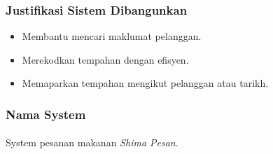 \documentclass[main.tex]{subfiles}
\begin{document}
\subsubsection*{Justifikasi Sistem Dibangunkan}

\begin{itemize}
    \item Membantu mencari maklumat pelanggan.
    \item Merekodkan tempahan dengan efisyen.
    \item Memaparkan tempahan mengikut pelanggan atau tarikh.
\end{itemize}

\subsubsection*{Nama System}

\paragraph{} System pesanan makanan \textit{Shima Pesan}.
\end{document}

